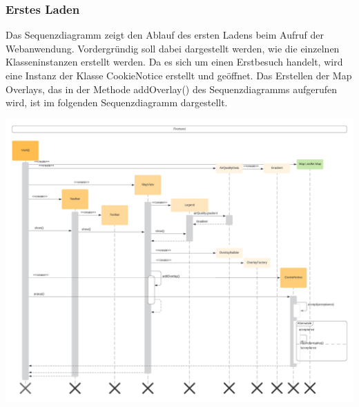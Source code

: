 \subsubsection{Erstes Laden}
\label{Erstes Laden}
Das Sequenzdiagramm zeigt den Ablauf des ersten Ladens beim Aufruf der Webanwendung. Vordergründig soll dabei dargestellt werden, wie die einzelnen Klasseninstanzen erstellt werden. Da es sich um einen Erstbesuch handelt, wird eine Instanz der Klasse CookieNotice erstellt und geöffnet. Das Erstellen der Map Overlays, das in der Methode addOverlay() des Sequenzdiagramms aufgerufen wird, ist im folgenden Sequenzdiagramm dargestellt. 
\begin{center}
	\includegraphics[width=1.2\textwidth]{media/frontend/sequence-diagram/sequenceFirstLoad.png} 
\end{center}
\clearpage %
